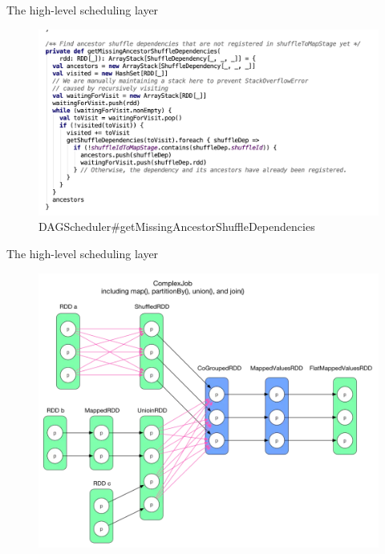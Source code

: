 \begin{frame}[plain,t]{The high-level scheduling layer} %
	 \\  
	\begin{figure}
		\centering
		\includegraphics[width=0.9\linewidth]{images/dag011}
		\caption{DAGScheduler\#getMissingAncestorShuffleDependencies}
		\label{fig:dag011}
	\end{figure}
	
	
\end{frame}


\begin{frame}[plain,t]{The high-level scheduling layer} %
	 \\  
	\begin{figure}
		\centering
		\includegraphics[width=0.9\linewidth, height=0.9\textheight]{images/dag003}
	
		\label{fig:dag003}
	\end{figure}
\end{frame}


